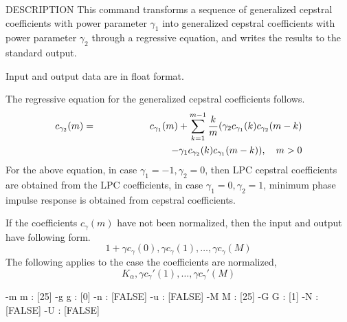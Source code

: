 \begin{qsection}{DESCRIPTION}
This command transforms a sequence of generalized cepstral coefficients
with power parameter $\gamma_1$ into generalized cepstral coefficients
with power parameter $\gamma_2$ through a regressive equation,
and writes the results to the standard output.
\par
Input and output data are in float format.
\par
The regressive equation for the generalized cepstral coefficients 
follows.
\begin{eqnarray*}
  c_{\gamma_2}(m) &=& c_{\gamma_1}(m) + \sum_{k=1}^{m-1}\frac{k}{m}
		      (\gamma_2 c_{\gamma_1}(k)c_{\gamma_2}(m-k) \nonumber\\
     		  & & \hspace{25mm} -\gamma_1 c_{\gamma_2}(k)
			c_{\gamma_1}(m-k)), ~~~m>0
\end{eqnarray*}
For the above equation, in case $\gamma_1=-1, \gamma_2=0$,
then LPC cepstral coefficients are obtained from the LPC coefficients,
in case $\gamma_1=0, \gamma_2=1$, minimum phase impulse response is
obtained from cepstral coefficients.

If the coefficients $c_\gamma(m)$ have not been normalized,
then the input and output have following form.
\begin{displaymath}
1+\gamma c_\gamma(0), \gamma c_\gamma(1), \ldots, \gamma c_\gamma(M)
\end{displaymath}
The following applies to the case the coefficients are normalized,
\begin{displaymath}
K_\alpha,\gamma c_\gamma'(1),\ldots, \gamma c_\gamma'(M)
\end{displaymath}

\end{qsection}

\begin{options}
       -m m  :   [25]
       -g g  :   [0]
       -n    :     [FALSE]
       -u    :     [FALSE]
       -M M  :  [25]
       -G G  :  [1]
       -N    :    [FALSE]
       -U    :    [FALSE]
\end{options}

